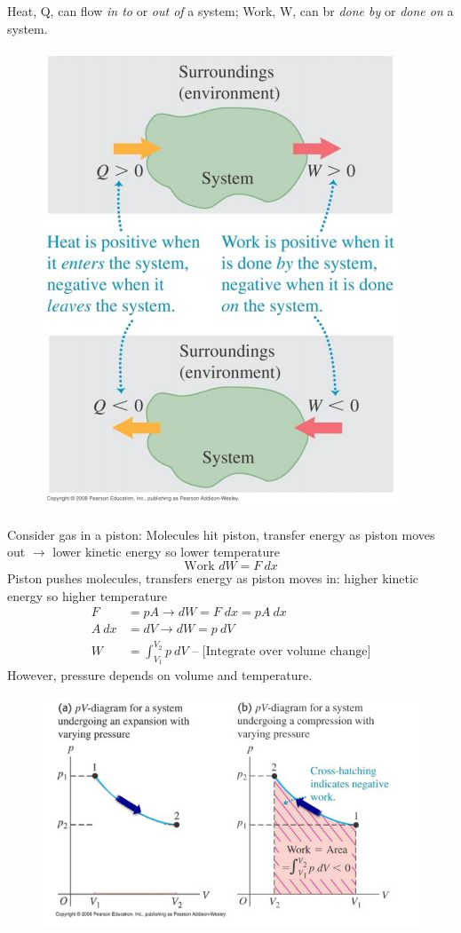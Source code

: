 \documentclass[a4paper, 11pt, normalem]{report}
\begin{document}
Heat, Q, can flow \emph{in to} or \emph{out of} a system; Work, W, can br \emph{done by} or \emph{done on} a system.
\begin{figure}[H]
    \centering
    \includegraphics{ThermoSystem.jpg}
\end{figure}
Consider gas in a piston:
Molecules hit piston, transfer energy as piston moves out $\rightarrow$ lower kinetic energy so lower temperature
\begin{equation}
	\text{Work } dW = F\:dx
\end{equation}
Piston pushes molecules, transfers energy as piston moves in: higher kinetic energy so higher temperature
\begin{align}
    F &= pA \rightarrow dW = F\;dx = pA\:dx \\
    A\:dx &= dV \rightarrow dW = p\:dV \\
    W &= \int_{V_{1}}^{V_{2}} p\:dV \text{ -- [Integrate over volume change]}
\end{align}
However, pressure depends on volume and temperature.
\begin{figure}[H]
    \centering
    \includegraphics[scale=0.8]{pV.jpg} 
\end{figure}
\end{document}
